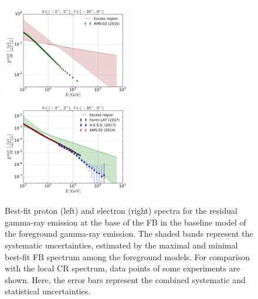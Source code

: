 \begin{figure}[h]
\includegraphics[width=0.5\textwidth]{plots/Summary_proton_spectra_0.pdf}
\includegraphics[width=0.5\textwidth]{plots/Summary_electron_spectra_0.pdf}
  	\caption{
	Best-fit proton (left) and electron (right) spectra for the residual gamma-ray emission at the base of the FB 
	in the baseline model of the foreground gamma-ray emission. 
	The shaded bands represent the systematic uncertainties, 
	estimated by the maximal and minimal best-fit FB spectrum among the foreground models. 
	For comparison with the local CR spectrum, data points of some experiments are shown. 
	Here, the error bars represent the combined systematic and statistical uncertainties.}
  	\label{fig:Particle_spectra}
\end{figure}


